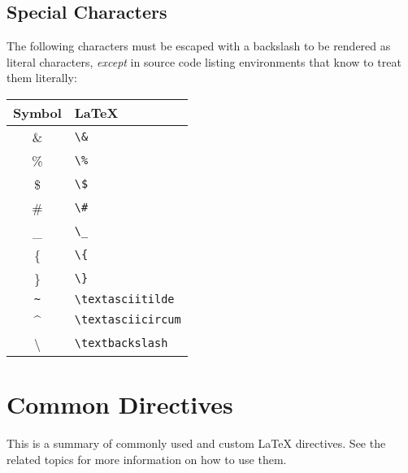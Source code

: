 \begin{samepage}
\section{Special Characters}

The following characters must be escaped with a backslash to be rendered as literal characters, \emph{except} in source code listing environments that know to treat them literally:

\begin{center}
\begin{tabular}{|c|l|}
\hline
\textbf{Symbol} & \textbf{LaTeX} \\
\hline
\& & \verb|\&| \\
\% & \verb|\%| \\
\$ & \verb|\$| \\
\# & \verb|\#| \\
\_ & \verb|\_| \\
\{ & \verb|\{| \\
\} & \verb|\}| \\
\texttt{\textasciitilde} & \verb|\textasciitilde| \\
\textasciicircum & \verb|\textasciicircum| \\
\textbackslash & \verb|\textbackslash| \\
\hline
\end{tabular}
\end{center}
\end{samepage}

\section{Common Directives}

This is a summary of commonly used and custom LaTeX directives. See the related topics for more information on how to use them.

